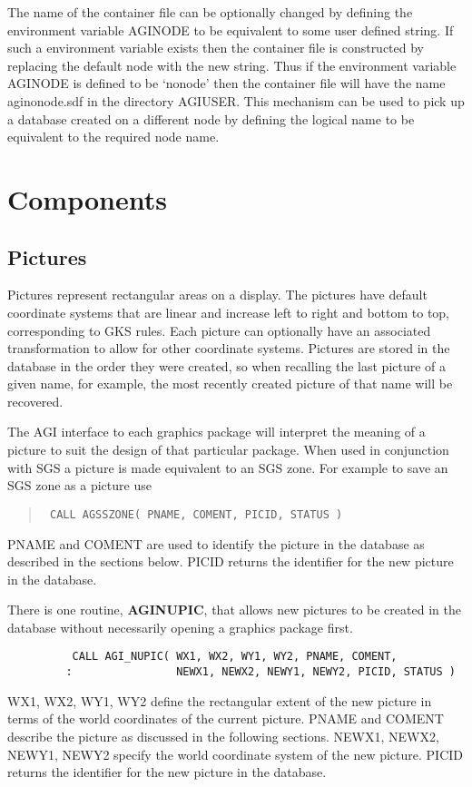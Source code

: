 \documentclass[twoside,11pt]{article}
\newcommand{\htmlref}[2]{#1}
\renewcommand{\_}{\texttt{\symbol{95}}}
\begin{document}
The name of the container file can be optionally changed by defining the
environment variable AGI\_NODE to be equivalent to some user defined string.
If such a environment variable exists then the container file is constructed
by replacing the default node with the new string. Thus if the environment 
variable AGI\_NODE is defined to be `nonode' then the container file will
have the name agi\_nonode.sdf in the directory AGI\_USER. This mechanism
can be used to pick up a database created on a different node by
defining the logical name to be equivalent to the required node name.

\section {Components}

\subsection{Pictures}

Pictures represent rectangular areas on a display.
The pictures have default coordinate systems that are linear and increase
left to right and bottom to top, corresponding to GKS rules.
Each picture can optionally have an associated transformation to allow for
other coordinate systems.
Pictures are stored in the database in the order they were created, so when
recalling the last picture of a given name, for example, the most recently
created picture of that name will be recovered.

The AGI interface to each graphics package will interpret the meaning of a
picture to suit the design of that particular package.
When used in conjunction with SGS a picture is made equivalent to an SGS zone.
For example to save an SGS zone as a picture use
\begin{quote}{\tt
          CALL \htmlref{AGS\_SZONE}{AGS_SZONE}( PNAME, COMENT, PICID, STATUS )}
\end{quote}
PNAME and COMENT are used to identify the picture in the database as described
in the sections below.
PICID returns the identifier for the new picture in the database.

There is one routine, \htmlref{{\bf AGI\_NUPIC}}{AGI_NUPIC}, 
that allows new pictures to be created
in the database without necessarily opening a graphics package first.
\begin{verbatim}
          CALL AGI_NUPIC( WX1, WX2, WY1, WY2, PNAME, COMENT,
         :                NEWX1, NEWX2, NEWY1, NEWY2, PICID, STATUS )
\end{verbatim}
WX1, WX2, WY1, WY2 define the rectangular extent of the new picture in terms of
the world coordinates of the current picture.
PNAME and COMENT describe the picture as discussed in the following
sections.
NEWX1, NEWX2, NEWY1, NEWY2 specify the world coordinate system of the new
picture.
PICID returns the identifier for the new picture in the database.
\end{document}
